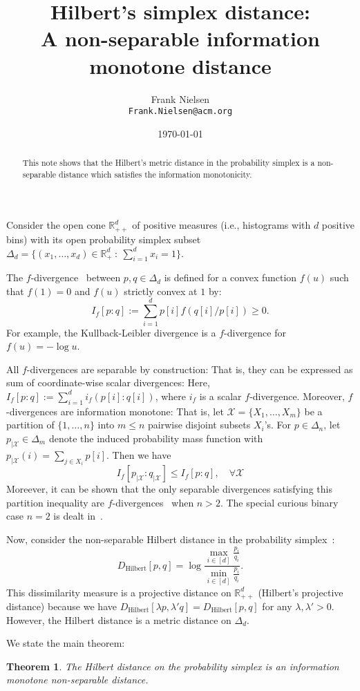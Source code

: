 \documentclass{article}
\title{Hilbert's simplex distance:\\ A non-separable information monotone distance}
\author{Frank Nielsen\\ {\tt Frank.Nielsen@acm.org}}
\date{\today}
\newtheorem{theorem}{Theorem}
\def\bbR{\mathbb{R}}
\def\bbR{\mathbb{R}}
\def\calX{\mathcal{X}}
\def\Hilbert{\mathrm{Hilbert}}
\begin{document}
\maketitle

\begin{abstract}
This note shows that the Hilbert's metric distance in the probability simplex is a non-separable distance which satisfies the information monotonicity. 
\end{abstract}

Consider the open cone $\bbR_{++}^d$ of positive measures (i.e., histograms with $d$ positive bins) with its open probability simplex subset 
$\Delta_d=\{(x_1,\ldots,x_d)\in\bbR_+^d\ :\ \sum_{i=1}^d  x_i=1\}$.

The $f$-divergence~\cite{amari2016information} between $p,q\in\Delta_d$ is defined for a convex function $f(u)$ such that $f(1)=0$ and $f(u)$ strictly convex at $1$ by:
$$
I_f[p:q]:=\sum_{i=1}^d p[i] f(q[i]/p[i])\geq 0.
$$
For example, the Kullback-Leibler divergence is a $f$-divergence for $f(u)=-\log u$.

All $f$-divergences are separable by construction: 
That is, they can be expressed as sum of coordinate-wise scalar divergences: Here, $I_f[p:q]:=\sum_{i=1}^d i_{f}(p[i]:q[i])$, where $i_f$ is a scalar $f$-divergence.
Moreover, $f$-divergences are information monotone: 
That is, let $\calX=\{X_1,\ldots, X_m\}$ be a partition of $\{1,\ldots, n\}$ into $m\leq n$ pairwise disjoint subsets $X_i$'s.
For $p\in\Delta_n$, let $p_{|\calX}\in\Delta_m$ denote the induced probability mass function with $p_{|\calX}(i)=\sum_{j\in X_i} p[i]$.
Then we have
$$
I_f[p_{|\calX}:q_{|\calX}]\leq I_f[p:q], \quad\forall\calX
$$ 
Moreever, it can be shown that the only separable divergences satisfying this partition inequality are $f$-divergences~\cite{amari2016information} when $n>2$. The special curious binary case $n=2$ is dealt in~\cite{jiao2014information}.

Now, consider the non-separable Hilbert distance in the probability simplex~\cite{nielsen2019clustering}:
$$
D_\Hilbert[p,q]=\log \frac{\max_{i\in [d]} \frac{p_i}{q_i}}{\min_{i\in [d]} \frac{p_i}{q_i}}. 
$$
This dissimilarity measure is a projective distance on $\bbR^d_{++}$ (Hilbert's projective distance) because 
we have $D_\Hilbert[\lambda p,\lambda' q]=D_\Hilbert[p,q]$ for any $\lambda,\lambda'>0$.
However, the Hilbert distance is a metric distance on $\Delta_d$.

We state the main theorem:

\begin{theorem}
The Hilbert distance on the probability simplex is an information monotone non-separable distance.
\end{theorem}
\end{document}
